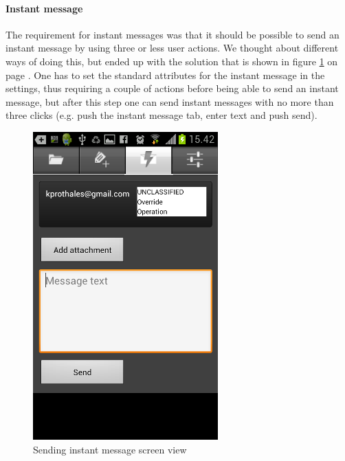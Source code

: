 \newpage

\paragraph{Instant message}\hfill
\newline
The requirement for instant messages was that it should be possible to send an instant message by using three or less user actions. We thought about different ways of doing this, but ended up with the solution that is shown in figure \ref{fig:frontend_instamessage} on page \pageref{fig:frontend_instamessage}.
One has to set the standard attributes for the instant message in the settings, thus requiring a couple of actions before being able to send an instant message, but after this step one can send instant messages with no more than three clicks (e.g. push the instant message tab, enter text and push send). 

\begin{figure}[H]
\begin{center}
\includegraphics{instantmessage_final}
\end{center}
\caption{Sending instant message screen view} \label{fig:frontend_instamessage}
\end{figure}

\newpage

